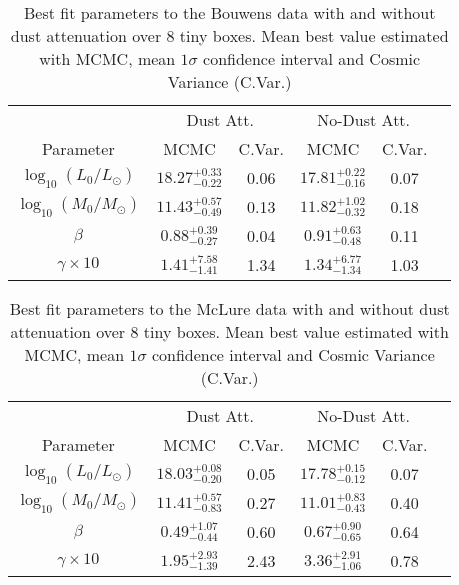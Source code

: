 \documentclass{emulateapj}
\begin{document}
\begin{table}
\begin{center}
\begin{tabular}{cccccc}\hline\hline
 & \multicolumn{2}{c}{Dust Att.} & \multicolumn{2}{c}{No-Dust Att.}\\
Parameter                  & MCMC                  & C.Var. & MCMC                    & C.Var. \\\hline
$\log_{10}(L_0/L_{\odot})$ & $18.27_{-0.22}^{+0.33}$ & 0.06 & $17.81_{-0.16}^{+0.22}$ & 0.07  \\
$\log_{10}(M_0/M_{\odot})$ & $11.43_{-0.49}^{+0.57}$ & 0.13 & $11.82_{-0.32}^{+1.02}$ & 0.18  \\
$\beta$                    & $ 0.88_{-0.27}^{+0.39}$ & 0.04 & $ 0.91_{-0.48}^{+0.63}$ & 0.11  \\
$\gamma\times10$           & $ 1.41_{-1.41}^{+7.58}$ & 1.34 & $ 1.34_{-1.34}^{+6.77}$ & 1.03  \\
\hline\hline
\end{tabular}
\caption{ Best fit parameters to the Bouwens data with and without 
dust attenuation over 8 tiny boxes. Mean best value estimated 
with MCMC, mean $1\sigma$ confidence interval and Cosmic Variance
(C.Var.)
} 
\label{table:Bouwens_best_fit_parameters_no_dust}
\end{center}
\end{table}


\begin{table}
\begin{center}
\begin{tabular}{cccccc}\hline\hline
 & \multicolumn{2}{c}{Dust Att.} & \multicolumn{2}{c}{No-Dust Att.}\\
Parameter                  & MCMC                  & C.Var. & MCMC                    & C.Var. \\\hline
$\log_{10}(L_0/L_{\odot})$ & $18.03_{-0.20}^{+0.08}$ & 0.05 & $17.78_{-0.12}^{+0.15}$ & 0.07  \\
$\log_{10}(M_0/M_{\odot})$ & $11.41_{-0.83}^{+0.57}$ & 0.27 & $11.01_{-0.43}^{+0.83}$ & 0.40  \\
$\beta$                    & $ 0.49_{-0.44}^{+1.07}$ & 0.60 & $ 0.67_{-0.65}^{+0.90}$ & 0.64  \\
$\gamma\times10$           & $ 1.95_{-1.39}^{+2.93}$ & 2.43 & $ 3.36_{-1.06}^{+2.91}$ & 0.78  \\
\hline\hline
\end{tabular}
\caption{ Best fit parameters to the McLure data with and without 
dust attenuation over 8 tiny boxes. Mean best value estimated 
with MCMC, mean $1\sigma$ confidence interval and Cosmic Variance
(C.Var.)
} 
\label{table:McLure_best_fit_parameters_no_dust}
\end{center}
\end{table}
\end{document}

